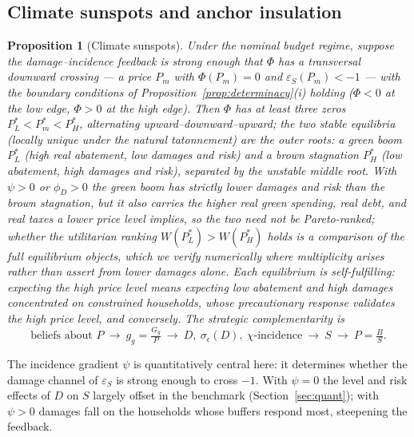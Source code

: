 \documentclass[12pt]{article}
\newtheorem{proposition}{Proposition}
\newcommand{\Sfun}{S}
\begin{document}
\subsection{Climate sunspots and anchor insulation}

\begin{proposition}[Climate sunspots]\label{prop:sunspots}
Under the nominal budget regime, suppose the damage--incidence feedback is
strong enough that $\Phi$ has a transversal \emph{downward} crossing --- a
price $P_m$ with $\Phi(P_m)=0$ and $\varepsilon_S(P_m)<-1$ --- with the
boundary conditions of Proposition~\ref{prop:determinacy}(i) holding
($\Phi<0$ at the low edge, $\Phi>0$ at the high edge). Then $\Phi$ has at
least \emph{three} zeros $P_L^{*}<P_m^{*}<P_H^{*}$, alternating
upward--downward--upward; the two \emph{stable} equilibria (locally unique
under the natural tatonnement) are the outer roots: a \emph{green boom}
$P_L^{*}$ (high real abatement, low damages and risk) and a \emph{brown
stagnation} $P_H^{*}$ (low abatement, high damages and risk), separated by
the unstable middle root. With $\psi>0$ or $\phi_D>0$ the green boom has strictly
lower damages and risk than the brown stagnation, but it also carries the
higher real green spending, real debt, and real taxes a lower price level
implies, so the two need not be Pareto-ranked; whether the utilitarian
ranking $W(P_L^{*})>W(P_H^{*})$ holds is a comparison of the full
equilibrium objects, which we verify numerically where multiplicity arises
rather than assert from lower damages alone. Each equilibrium is
self-fulfilling: expecting the high price
level means expecting low abatement and high damages concentrated on
constrained households, whose precautionary response validates the high price
level, and conversely. The strategic complementarity is
\begin{equation*}
\text{beliefs about } P \ \longrightarrow\ g_g=\tfrac{G_g}{P}
\ \longrightarrow\ D,\ \sigma_\epsilon(D),\ \chi\text{-incidence}
\ \longrightarrow\ \Sfun \ \longrightarrow\ P=\tfrac{B}{\Sfun}.
\end{equation*}
\end{proposition}

The incidence gradient $\psi$ is quantitatively central here: it determines
whether the damage channel of $\varepsilon_S$ is strong enough to cross $-1$.
With $\psi=0$ the level and risk effects of $D$ on $\Sfun$ largely offset in
the benchmark (Section~\ref{sec:quant}); with $\psi>0$ damages fall on the
households whose buffers respond most, steepening the feedback.
\end{document}
